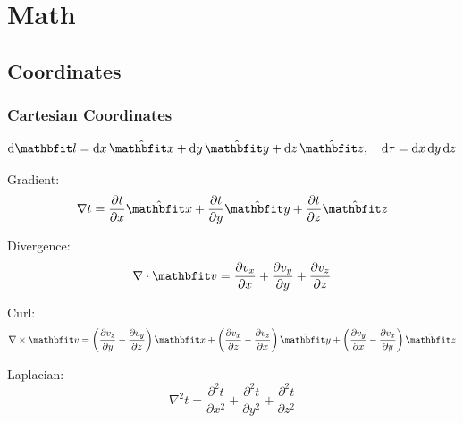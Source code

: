 \documentclass[a4paper,oneside,article]{memoir}
\begin{document}
\newcommand{\hv}[2][]{%
    \if\relax\detokenize{#1}\relax
        |#2\rangle%
    \else
        \if\relax\detokenize{#2}\relax
            \langle #1|%
        \else
            \langle #1|#2\rangle%
        \fi
    \fi
}
 
 
 
\pagestyle{Title}
{}
\newpage
 
\chapter{Math}
\section{Coordinates}
\subsection*{Cartesian Coordinates}

\[
\mathrm{d}\v{l} = \mathrm{d}x\,\hat{\v{x}} + \mathrm{d}y\,\hat{\v{y}} + \mathrm{d}z\,\hat{\v{z}}, \quad
\mathrm{d}\tau = \mathrm{d}x\,\mathrm{d}y\,\mathrm{d}z
\]

Gradient:
\[
\nabla t = \frac{\partial t}{\partial x} \hat{\v{x}} + \frac{\partial t}{\partial y} \hat{\v{y}} + \frac{\partial t}{\partial z} \hat{\v{z}}
\]

Divergence:
\[
\nabla \cdot \v{v} = \frac{\partial v_x}{\partial x} + \frac{\partial v_y}{\partial y} + \frac{\partial v_z}{\partial z}
\]

Curl:
\[
\nabla \times \v{v} =
\left( \frac{\partial v_z}{\partial y} - \frac{\partial v_y}{\partial z} \right) \hat{\v{x}} +
\left( \frac{\partial v_x}{\partial z} - \frac{\partial v_z}{\partial x} \right) \hat{\v{y}} +
\left( \frac{\partial v_y}{\partial x} - \frac{\partial v_x}{\partial y} \right) \hat{\v{z}}
\]

Laplacian:
\[
\nabla^2 t = \frac{\partial^2 t}{\partial x^2} + \frac{\partial^2 t}{\partial y^2} + \frac{\partial^2 t}{\partial z^2}
\]
\end{document}
